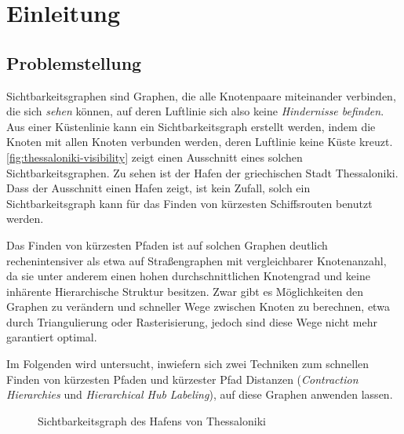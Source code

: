\chapter{Einleitung}

\section{Problemstellung}
Sichtbarkeitsgraphen sind Graphen, die alle Knotenpaare miteinander verbinden, die sich \emph{sehen} können, auf deren Luftlinie sich also keine \emph{Hindernisse befinden}.
Aus einer Küstenlinie kann ein Sichtbarkeitsgraph erstellt werden, indem die Knoten mit allen Knoten verbunden werden, deren Luftlinie keine Küste kreuzt.
\autoref{fig:thessaloniki-visibility} zeigt einen Ausschnitt eines solchen Sichtbarkeitsgraphen.
Zu sehen ist der Hafen der griechischen Stadt Thessaloniki.
Dass der Ausschnitt einen Hafen zeigt, ist kein Zufall, solch ein Sichtbarkeitsgraph kann für das Finden von kürzesten Schiffsrouten benutzt werden.

Das Finden von kürzesten Pfaden ist auf solchen Graphen deutlich rechenintensiver als etwa auf Straßengraphen mit vergleichbarer Knotenanzahl, da sie unter anderem einen hohen durchschnittlichen Knotengrad und keine inhärente Hierarchische Struktur besitzen.
Zwar gibt es Möglichkeiten den Graphen zu verändern und schneller Wege zwischen Knoten zu berechnen, etwa durch Triangulierung oder Rasterisierung, jedoch sind diese Wege nicht mehr garantiert optimal.

Im Folgenden wird untersucht, inwiefern sich zwei Techniken zum schnellen Finden von kürzesten Pfaden und kürzester Pfad Distanzen (\emph{Contraction Hierarchies} und \emph{Hierarchical Hub Labeling}), auf diese Graphen anwenden lassen.

\begin{figure}[ht]%
    \centering
    \caption{Sichtbarkeitsgraph des Hafens von Thessaloniki}%
    \label{fig:thessaloniki-visibility}%
\end{figure}

